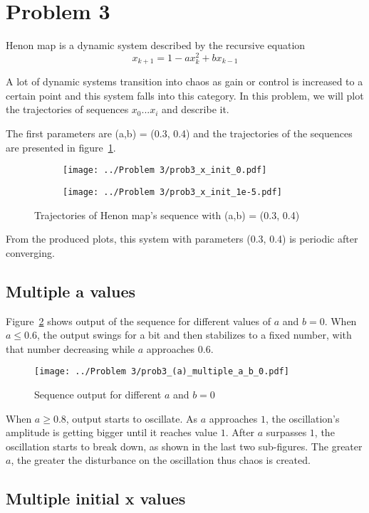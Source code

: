 \section{Problem 3}

Henon map is a dynamic system described by the recursive equation 
\[
x_{k+1} = 1 - ax^2_k + bx_{k-1}
\]

A lot of dynamic systems transition into chaos as gain or control is increased to a certain point and this system falls into this category.
In this problem, we will plot the trajectories of sequences $x_0 ... x_i$ and describe it.

The first parameters are (a,b) = (0.3, 0.4) and the trajectories of the sequences are presented in figure~\ref{fig:prob3_x_init}.

\begin{figure}[htpb]
	\centering
	\begin{subfigure}{.47\textwidth}
		\centering
		\texttt{[image: ../Problem 3/prob3\_x\_init\_0.pdf]}
		\caption{}
	\end{subfigure}
	\hspace{1mm}
	\begin{subfigure}{.47\textwidth}
		\centering
		\texttt{[image: ../Problem 3/prob3\_x\_init\_1e-5.pdf]}
		\caption{}
	\end{subfigure}
	\caption{Trajectories of Henon map's sequence with (a,b) = (0.3, 0.4)}
	\label{fig:prob3_x_init}
\end{figure}
From the produced plots, this system with parameters (0.3, 0.4) is periodic after converging.

\subsection{Multiple a values}
Figure~\ref{fig:prob3_multiple_a} shows output of the sequence for different values of $a$ and $b=0$. When $a \le 0.6$, the output swings for a bit and then stabilizes to a fixed number, with that number decreasing while $a$ approaches $0.6$.


\begin{figure}[htpb]
	\centering
	\texttt{[image: ../Problem 3/prob3\_(a)\_multiple\_a\_b\_0.pdf]}
	\caption{Sequence output for different $a$ and $b=0$}
	\label{fig:prob3_multiple_a}
\end{figure}

When $a \ge 0.8$, output starts to oscillate. As $a$ approaches $1$, the oscillation's amplitude is getting bigger until it reaches value $1$.
After $a$ surpasses $1$, the oscillation starts to break down, as shown in the last two sub-figures. The greater $a$, the greater the disturbance on the oscillation thus chaos is created.

\subsection{Multiple initial x values}

